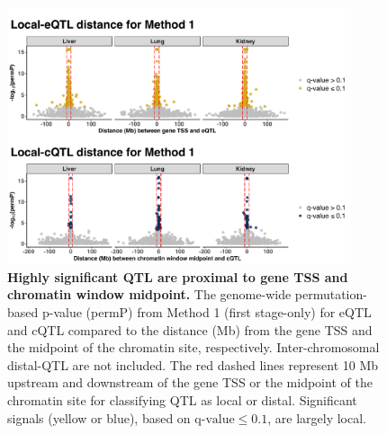 \documentclass[9pt,twocolumn,twoside]{gsajnl}
\begin{document}
\begin{figure}[hp]
\renewcommand{\familydefault}{\sfdefault}\normalfont
\centering
\includegraphics[width=0.9\textwidth]{figs/qtl_distance_method1.pdf}
\caption{\textbf{Highly significant QTL are proximal to gene TSS and chromatin window midpoint.} The genome-wide permutation-based p-value (permP) from Method 1 (first stage-only) for eQTL and cQTL compared to the distance (Mb) from the gene TSS and the midpoint of the chromatin site, respectively. Inter-chromosomal distal-QTL are not included. The red dashed lines represent 10 Mb upstream and downstream of the gene TSS or the midpoint of the chromatin site for classifying QTL as local or distal. Significant signals (yellow or blue), based on $\text{q-value} \le 0.1$, are largely local. \label{fig:genomewide_dist}}
\end{figure}
\end{document}
